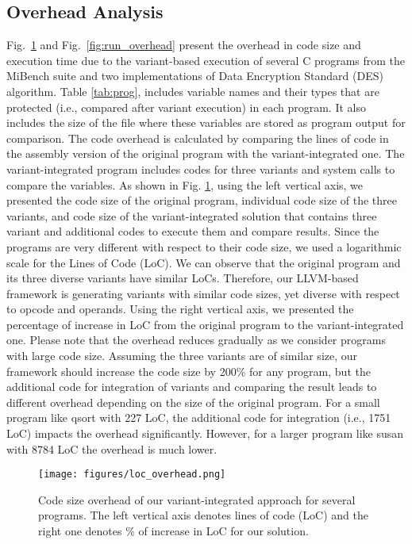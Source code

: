 \documentclass[conference]{IEEEtran}
\begin{document}
\subsection{Overhead Analysis}
Fig.~\ref{fig:code_overhead} and Fig.~\ref{fig:run_overhead} present the overhead in code size and execution time due to the variant-based execution of several C programs from the MiBench suite and two implementations of Data Encryption Standard (DES) algorithm. Table \ref{tab:prog}, includes variable names and their types that are protected (i.e., compared after variant execution) in each program. It also includes the size of the file where these variables are stored as program output for comparison. 
The code overhead is calculated by comparing the lines of code in the assembly version of the original program with the variant-integrated one. The variant-integrated program includes codes for three variants and system calls to compare the variables.  As shown in Fig. \ref{fig:code_overhead}, using the left vertical axis, we presented the code size of the original program, individual code size of the three variants, and code size of the variant-integrated solution that contains three variant and additional codes to execute them and compare results. Since the programs are very different with respect to their code size, we used a logarithmic scale for the Lines of Code (LoC). We can observe that the original program and its three diverse variants have similar LoCs. Therefore, our LLVM-based framework is generating variants with similar code sizes, yet diverse with respect to opcode and operands. 
Using the right vertical axis, we presented the percentage of increase in LoC from the original program to the variant-integrated one. Please note that the overhead reduces gradually as we consider programs with large code size. Assuming the three variants are of similar size, our framework should increase the code size by 200\% for any program, but the additional code for integration of variants and comparing the result leads to different overhead depending on the size of the original program. For a small program like qsort with 227 LoC, the additional code for integration (i.e., 1751 LoC) impacts the overhead significantly. However, for a larger program like susan	with 8784 LoC the overhead is much lower. 




 \begin{figure}[t!]
\centerline{\texttt{[image: figures/loc\_overhead.png]}}
\caption{Code size overhead of our variant-integrated approach for several programs. The left vertical axis denotes lines of code (LoC) and the right one denotes \% of increase in LoC for our solution.     }
\label{fig:code_overhead}
\end{figure}
\end{document}
